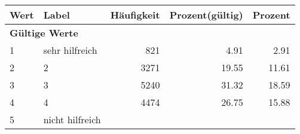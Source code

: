      \begin{longtable}{lXrrr}
     \toprule
     \textbf{Wert} & \textbf{Label} & \textbf{Häufigkeit} & \textbf{Prozent(gültig)} & \textbf{Prozent} \\
     \endhead
     \midrule
     \multicolumn{5}{l}{\textbf{Gültige Werte}}\\

     1 &
     \multicolumn{1}{X}{ sehr hilfreich   } &


       \num{821} &
       \num[round-mode=places,round-precision=2]{4.91} &
         \num[round-mode=places,round-precision=2]{2.91} \\

     2 &
     \multicolumn{1}{X}{ 2   } &


       \num{3271} &
       \num[round-mode=places,round-precision=2]{19.55} &
         \num[round-mode=places,round-precision=2]{11.61} \\

     3 &
     \multicolumn{1}{X}{ 3   } &


       \num{5240} &
       \num[round-mode=places,round-precision=2]{31.32} &
         \num[round-mode=places,round-precision=2]{18.59} \\

     4 &
     \multicolumn{1}{X}{ 4   } &


       \num{4474} &
       \num[round-mode=places,round-precision=2]{26.75} &
         \num[round-mode=places,round-precision=2]{15.88} \\

     5 &
     \multicolumn{1}{X}{ nicht hilfreich   } &



\end{longtable}
